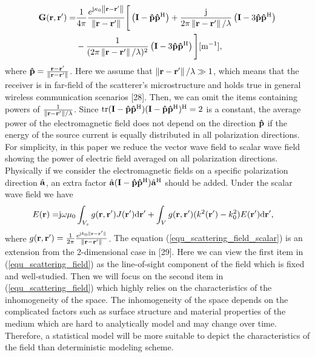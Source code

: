 \documentclass[a4paper,12pt]{article}
\begin{document}
\begin{framed}
{\begin{equation}
	\begin{aligned}
		{\bf{G}}({\bf{r}},{\bf{r}'}) =& \frac{1}{{4\pi }}\frac{{{e^{{\rm{j}}\kappa_0 \left\| {{\bf{r}} - {\bf{r}'}} \right\|}}}}{{\left\| {{\bf{r}} - {\bf{r}'}} \right\|}}\Bigg[\left( {{\bf{I}} - {\bf{\hat p}}{{{\bf{\hat p}}}^{\rm{H}}}} \right) + \frac{{\rm j}}{2\pi \left\| {{\bf{r}} - {\bf{r}'}} \right\| /\lambda}\left( {\bf I}-3{\bf{\hat p}}{{{\bf{\hat p}}}^{\rm{H}}} \right) \\&-\frac{1}{(2\pi\left\| {{\bf{r}} - {\bf{r}'}} \right\|/\lambda )^2 }\left( {\bf I}-3{\bf{\hat p}}{{{\bf{\hat p}}}^{\rm{H}}}  \right) \Bigg] [{\rm m}^{-1}],
		\label{Green}
	\end{aligned}
\end{equation}
where ${\bf{\hat p}} = \frac{{\bf{r}} - {\bf{r}'}}{{\left\| {\bf{r}} - {\bf{r}'} \right\|}}$.
Here we assume that $\left\| {{\bf{r}} - {\bf{r}'}} \right\|/\lambda \gg 1$, which means that the receiver is in far-field of the scatterer's microstructure and holds true in general wireless communication scenarios [28]. Then, we can omit the items containing powers of $\frac{1}{\left\| {{\bf{r}} - {\bf{r}'}} \right\|/\lambda}$. Since ${\rm tr}({\bf I}-{\bf{\hat p}}{{{\bf{\hat p}}}^{\rm{H}}})({\bf I}-{\bf{\hat p}}{{{\bf{\hat p}}}^{\rm{H}}})^{\rm H} = 2$ is a constant, the average power of the electromagnetic field does not depend on the direction ${\bf{\hat p}}$ if the energy of the source current is equally distributed in all polarization directions. For simplicity, in this paper we reduce the vector wave field to scalar wave field showing the power of electric field averaged on all polarization directions. Physically if we consider the electromagnetic fields on a specific polarization direction $\hat{\bf a}$, an extra factor $\hat{\bf a}({\bf{I}} - {\bf{\hat p}}{{{\bf{\hat p}}}^{\rm{H}}})\hat{\bf a}^{\rm H}$ should be added. Under the scalar wave field we have
\begin{equation}
	\begin{aligned} 
		E({\bf r}) =& {\rm j}\omega\mu_0\int_{V_s} g({\bf r},{\bf r}')J({\bf r}'){\rm d}{\bf r}' + \int_{V} g({\bf r},{\bf r}')(k^2({\bf r}')-k_0^2) 
		E({\bf r}'){\rm d}{\bf r}',
	\end{aligned}
	\label{equ_scattering_field_scalar}
\end{equation}		
where $g({\bf r},{\bf r}') = \frac{1}{2\pi}\frac{e^{{\rm j}k_0\| {\bf r}-{\bf r}' \|}}{\|{\bf r}-{\bf r}' \|}$.
}
The equation (\ref{equ_scattering_field_scalar}) is an extension from the 2-dimensional case in [29]. Here we can view the first item in (\ref{equ_scattering_field}) as the line-of-sight component of the field which is fixed and well-studied. Then we will focus on the second item in (\ref{equ_scattering_field}) which highly relies on the characteristics of the inhomogeneity of the space. The inhomogeneity of the space depends on the complicated factors such as surface structure and material properties of the medium which are hard to analytically model and may change over time. Therefore, a statistical model will be more suitable to depict the characteristics of the field than deterministic modeling scheme. 
\end{framed}
\end{document}
